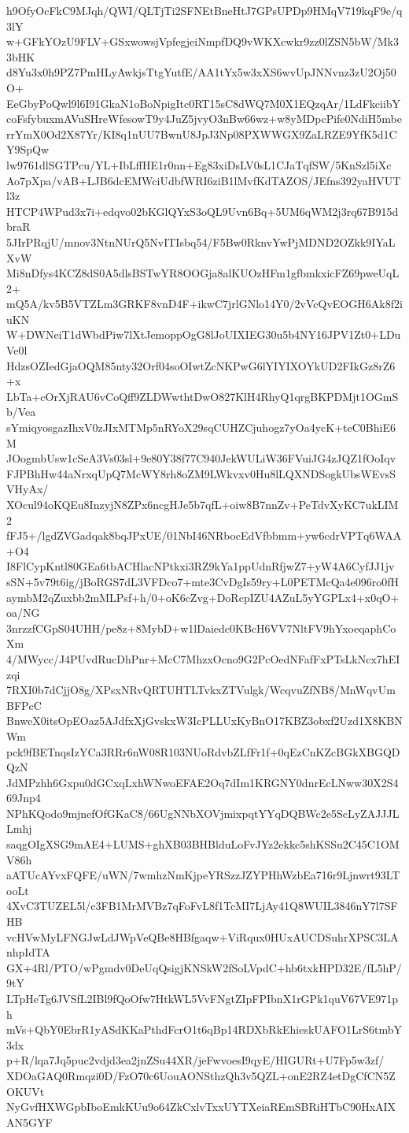 h9OfyOcFkC9MJqh/QWI/QLTjTi2SFNEtBneHtJ7GPsUPDp9HMqV719kqF9e/q3lY
w+GFkYOzU9FLV+GSxwowsjVpfegjeiNmpfDQ9vWKXcwkr9zz0lZSN5bW/Mk33bHK
d8Yu3x0h9PZ7PmHLyAwkjsTtgYutfE/AA1tYx5w3xXS6wvUpJNNvnz3zU2Oj50O+
EeGbyPoQwl9l6I91GkaN1oBoNpigItc0RT15sC8dWQ7M0X1EQzqAr/1LdFkciibY
coFsfybuxmAVuSHreWfesowT9y4JuZ5jvyO3nBw66wz+w8yMDpcPife0NdiH5mbe
rrYmX0Od2X87Yr/KI8q1nUU7BwnU8JpJ3Np08PXWWGX9ZaLRZE9YfK5d1CY9SpQw
lw9761dlSGTPcu/YL+IbLffHE1r0nn+Eg83xiDsLV0sL1CJaTqfSW/5KnSzl5iXc
Ao7pXpa/vAB+LJB6dcEMWciUdbfWRI6ziB1lMvfKdTAZOS/JEfns392yaHVUTl3z
HTCP4WPud3x7i+edqvo02bKGlQYxS3oQL9Uvn6Bq+5UM6qWM2j3rq67B915dbraR
5JIrPRqjU/mnov3NtnNUrQ5NvITIsbq54/F5Bw0RknvYwPjMDND2OZkk9IYaLXvW
Mi8nDfys4KCZ8dS0A5dlsBSTwYR8OOGja8alKUOzHFm1gfbmkxicFZ69pweUqL2+
mQ5A/kv5B5VTZLm3GRKF8vnD4F+ikwC7jrlGNlo14Y0/2vVcQvEOGH6Ak8f2iuKN
W+DWNeiT1dWbdPiw7lXtJemoppOgG8lJoUIXIEG30u5b4NY16JPV1Zt0+LDuVe0l
HdzsOZIedGjaOQM85nty32Orf04soOIwtZcNKPwG6lYIYIXOYkUD2FIkGz8rZ6+x
LbTa+cOrXjRAU6vCoQff9ZLDWwthtDwO827KlH4RhyQ1qrgBKPDMjt1OGmSb/Vea
sYmiqyosgazIhxV0zJIxMTMp5nRYoX29sqCUHZCjuhogz7yOa4ycK+teC0BhiE6M
JOogmbUsw1cSeA3Vs03sl+9e80Y38f77C940JekWULiW36FVuiJG4zJQZ1fOoIqv
FJPBhHw44aNrxqUpQ7McWY8rh8oZM9LWkvxv0Hu8lLQXNDSogkUbsWEvsSVHyAx/
XOcul94oKQEu8InzyjN8ZPx6ncgHJe5b7qfL+oiw8B7nnZv+PeTdvXyKC7ukLIM2
fFJ5+/lgdZVGadqak8bqJPxUE/01NbI46NRbocEdVfbbmm+yw6cdrVPTq6WAA+O4
I8FlCypKntl80GEa6tbACHlacNPtkxi3RZ9kYa1ppUdnRfjwZ7+yW4A6CyfJJ1jv
sSN+5v79t6ig/jBoRGS7dL3VFDco7+mte3CvDgIs59ry+L0PETMcQa4e096ro0fH
aymbM2qZuxbb2mMLPsf+h/0+oK6cZvg+DoRcpIZU4AZuL5yYGPLx4+x0qO+oa/NG
3nrzzfCGpS04UHH/pe8z+8MybD+w1lDaiedc0KBcH6VV7NltFV9hYxoeqaphCoXm
4/MWycc/J4PUvdRucDhPnr+McC7MhzxOcno9G2PcOedNFafFxPTsLkNcx7hEIzqi
7RXI0b7dCjjO8g/XPsxNRvQRTUHTLTvkxZTVulgk/WcqvuZfNB8/MnWqvUmBFPcC
BnweX0itsOpEOaz5AJdfxXjGvskxW3IcPLLUxKyBnO17KBZ3obxf2Uzd1X8KBNWm
pck9fBETnqsIzYCa3RRr6nW08R103NUoRdvbZLfFr1f+0qEzCnKZcBGkXBGQDQzN
JdMPzhh6Gxpu0dGCxqLxhWNwoEFAE2Oq7dIm1KRGNY0dnrEcLNww30X2S469Jnp4
NPhKQodo9mjnefOfGKaC8/66UgNNbXOVjmixpqtYYqDQBWc2e5ScLyZAJJJLLmhj
saqgOIgXSG9mAE4+LUMS+ghXB03BHBlduLoFvJYz2ekkc5shKSSu2C45C1OMV86h
aATUcAYvxFQFE/uWN/7wmhzNmKjpeYRSzzJZYPHhWzbEa716r9Ljnwrt93LTooLt
4XvC3TUZEL5l/c3FB1MrMVBz7qFoFvL8f1TcMI7LjAy41Q8WUIL3846nY7l7SFHB
vcHVwMyLFNGJwLdJWpVeQBe8HBfgaqw+ViRqux0HUxAUCDSuhrXPSC3LAnhpIdTA
GX+4Rl/PTO/wPgmdv0DeUqQsigjKNSkW2fSoLVpdC+hb6txkHPD32E/fL5hP/9tY
LTpHeTg6JVSfL2IBl9fQoOfw7HtkWL5VvFNgtZIpFPIbnX1rGPk1quV67VE971ph
mVs+QbY0EbrR1yASdKKaPthdFcrO1t6qBp14RDXbRkEhieskUAFO1LrS6tmbY3dx
p+R/lqa7Jq5puc2vdjd3ea2jnZSu44XR/jeFwvoesI9qyE/HIGURt+U7Fp5w3zf/
XDOaGAQ0Rmqzi0D/FzO70c6UouAONSthzQh3v5QZL+onE2RZ4etDgCfCN5ZOKUVt
NyGvfHXWGpbIboEmkKUu9o64ZkCxlvTxxUYTXeiaREmSBRiHTbC90HxAIXAN5GYF
